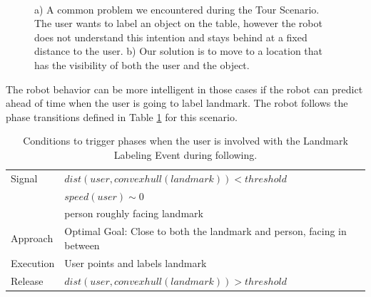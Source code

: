 \begin{figure}[ht!]
\centering
         \\
        \hspace*{3cm}
    \caption{a) A common problem we encountered during the Tour Scenario. The user wants to label an object on the table, however the robot does not understand this intention and stays behind at a fixed distance to the user. b) Our solution is to move to a location that has the visibility of both the user and the object.}
   \label{fig:landmark_labeling_example}
\end{figure}

 The robot behavior can be more intelligent in those cases if the robot can predict ahead of time when the user is going to label landmark. The robot follows the phase transitions defined in Table \ref{table:situation_aware_list_landmark} for this scenario.
 
\begin{table}[ht!]

	\caption{Conditions to trigger phases when the user is involved with the Landmark Labeling Event during following.}
	
		\centering
		
  \begin{tabular}{l |  m{10cm}}
    \toprule    
    Signal & {$dist(user, convex hull(landmark))<threshold$}\\       
	                           & {$speed(user)\sim 0$} \\
	                           & {person roughly facing landmark}\\ \midrule		                           		                                
    Approach & {Optimal Goal: Close to both the landmark and person, facing in between}\\       \midrule
    Execution & {User points and labels landmark}\\  \midrule
    Release & {$dist(user, convex hull(landmark))>threshold$}\\ 
    \bottomrule
  \end{tabular}
    \label{table:situation_aware_list_landmark}
\end{table}



